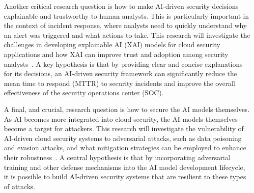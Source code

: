 Another critical research question is how to make AI-driven security decisions explainable and trustworthy to human analysts. This is particularly important in the context of incident response, where analysts need to quickly understand why an alert was triggered and what actions to take. This research will investigate the challenges in developing explainable AI (XAI) models for cloud security applications and how XAI can improve trust and adoption among security analysts~\cite{xai_cloud_security_2024}. A key hypothesis is that by providing clear and concise explanations for its decisions, an AI-driven security framework can significantly reduce the mean time to respond (MTTR) to security incidents and improve the overall effectiveness of the security operations center (SOC).

A final, and crucial, research question is how to secure the AI models themselves. As AI becomes more integrated into cloud security, the AI models themselves become a target for attackers. This research will investigate the vulnerability of AI-driven cloud security systems to adversarial attacks, such as data poisoning and evasion attacks, and what mitigation strategies can be employed to enhance their robustness~\cite{adversarial_ai_2024}. A central hypothesis is that by incorporating adversarial training and other defense mechanisms into the AI model development lifecycle, it is possible to build AI-driven security systems that are resilient to these types of attacks.


